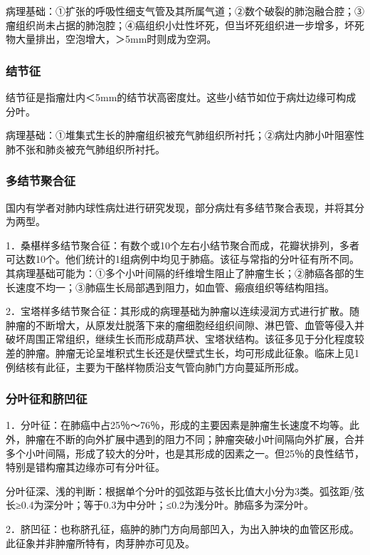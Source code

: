 病理基础：①扩张的呼吸性细支气管及其所属气道；②数个破裂的肺泡融合腔；③瘤组织尚未占据的肺泡腔；④癌组织小灶性坏死，但当坏死组织进一步增多，坏死物大量排出，空泡增大，＞5mm时则成为空洞。

\subsubsection{结节征}

结节征是指瘤灶内＜5mm的结节状高密度灶。这些小结节如位于病灶边缘可构成分叶。

病理基础：①堆集式生长的肿瘤组织被充气肺组织所衬托；②病灶内肺小叶阻塞性肺不张和肺炎被充气肺组织所衬托。

\subsubsection{多结节聚合征}

国内有学者对肺内球性病灶进行研究发现，部分病灶有多结节聚合表现，并将其分为两型。

1．桑椹样多结节聚合征：有数个或10个左右小结节聚合而成，花瓣状排列，多者可达数10个。他们统计的1组病例中均见于肺癌。该征与常指的分叶征有所不同。其病理基础可能为：①多个小叶间隔的纤维增生阻止了肿瘤生长；②肺癌各部的生长速度不均一；③肺癌生长局部遇到阻力，如血管、瘢痕组织等结构阻挡。

2．宝塔样多结节聚合征：其形成的病理基础为肿瘤以连续浸润方式进行扩散。随肿瘤的不断增大，从原发灶脱落下来的瘤细胞经组织间隙、淋巴管、血管等侵入并破坏周围正常组织，继续生长而形成葫芦状、宝塔状结构。该征多见于分化程度较差的肿瘤。肿瘤无论呈堆积式生长还是伏壁式生长，均可形成此征象。临床上见1例结核有此征，主要为干酪样物质沿支气管向肺门方向蔓延所形成。

\subsubsection{分叶征和脐凹征}

1．分叶征：在肺癌中占25％～76％，形成的主要因素是肿瘤生长速度不均等。此外，肿瘤在不断的向外扩展中遇到的阻力不同；肿瘤突破小叶间隔向外扩展，合并多个小叶间隔，形成了较大的分叶，也是其形成的因素之一。但25％的良性结节，特别是错构瘤其边缘亦可有分叶征。

分叶征深、浅的判断：根据单个分叶的弧弦距与弦长比值大小分为3类。弧弦距/弦长≥0.4为深分叶；等于0.3为中分叶；≤0.2为浅分叶。肺癌多为深分叶。

2．脐凹征：也称脐孔征，癌肿的肺门方向局部凹入，为出入肿块的血管区形成。此征象并非肿瘤所特有，肉芽肿亦可见及。

